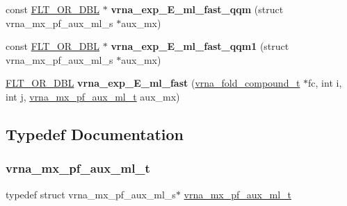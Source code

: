\begin{DoxyCompactItemize}
\item 
\mbox{\label{group__eval__loops__mb_gadb5ec8ebfe72254dace68f3693376643}} 
const \mbox{\hyperlink{group__data__structures_ga31125aeace516926bf7f251f759b6126}{F\+L\+T\+\_\+\+O\+R\+\_\+\+D\+BL}} $\ast$ {\bfseries vrna\+\_\+exp\+\_\+\+E\+\_\+ml\+\_\+fast\+\_\+qqm} (struct vrna\+\_\+mx\+\_\+pf\+\_\+aux\+\_\+ml\+\_\+s $\ast$aux\+\_\+mx)
\item 
\mbox{\label{group__eval__loops__mb_ga38ecb773ebbc084d563339919152bcf7}} 
const \mbox{\hyperlink{group__data__structures_ga31125aeace516926bf7f251f759b6126}{F\+L\+T\+\_\+\+O\+R\+\_\+\+D\+BL}} $\ast$ {\bfseries vrna\+\_\+exp\+\_\+\+E\+\_\+ml\+\_\+fast\+\_\+qqm1} (struct vrna\+\_\+mx\+\_\+pf\+\_\+aux\+\_\+ml\+\_\+s $\ast$aux\+\_\+mx)
\item 
\mbox{\label{group__eval__loops__mb_gaf688fa4e6331403debb9802f3fda8bf4}} 
\mbox{\hyperlink{group__data__structures_ga31125aeace516926bf7f251f759b6126}{F\+L\+T\+\_\+\+O\+R\+\_\+\+D\+BL}} {\bfseries vrna\+\_\+exp\+\_\+\+E\+\_\+ml\+\_\+fast} (\mbox{\hyperlink{group__fold__compound_ga1b0cef17fd40466cef5968eaeeff6166}{vrna\+\_\+fold\+\_\+compound\+\_\+t}} $\ast$fc, int i, int j, \mbox{\hyperlink{group__eval__loops__mb_ga39a8cc1385dcb542a60a9393cde6a1e3}{vrna\+\_\+mx\+\_\+pf\+\_\+aux\+\_\+ml\+\_\+t}} aux\+\_\+mx)
\end{DoxyCompactItemize}


\subsection{Typedef Documentation}
\mbox{\label{group__eval__loops__mb_ga39a8cc1385dcb542a60a9393cde6a1e3}} 
\subsubsection{\texorpdfstring{vrna\_mx\_pf\_aux\_ml\_t}{vrna\_mx\_pf\_aux\_ml\_t}}
{\footnotesize\ttfamily typedef struct vrna\+\_\+mx\+\_\+pf\+\_\+aux\+\_\+ml\+\_\+s$\ast$ \mbox{\hyperlink{group__eval__loops__mb_ga39a8cc1385dcb542a60a9393cde6a1e3}{vrna\+\_\+mx\+\_\+pf\+\_\+aux\+\_\+ml\+\_\+t}}}



